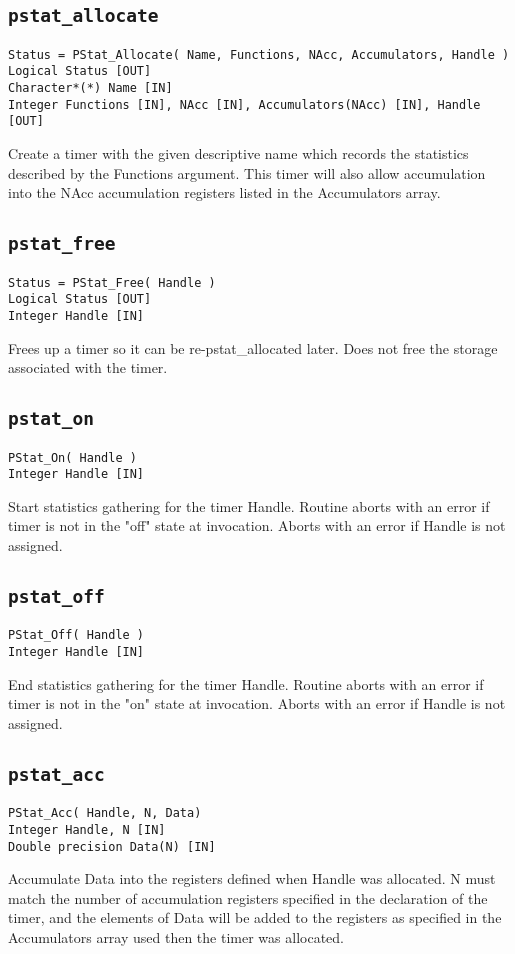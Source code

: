 \subsection{{\tt pstat\_allocate}}
\begin{verbatim}
Status = PStat_Allocate( Name, Functions, NAcc, Accumulators, Handle )
Logical Status [OUT]
Character*(*) Name [IN]
Integer Functions [IN], NAcc [IN], Accumulators(NAcc) [IN], Handle [OUT]
\end{verbatim}
Create a timer with the given descriptive name which records
the statistics described by the Functions argument. This timer
will also allow accumulation into the NAcc accumulation
registers listed in the Accumulators array.

\subsection{{\tt pstat\_free}}
\begin{verbatim}
Status = PStat_Free( Handle )
Logical Status [OUT]
Integer Handle [IN]
\end{verbatim}
Frees up a timer so it can be re-pstat\_allocated later.  Does
not free the storage associated with the timer.

\subsection{{\tt pstat\_on}}
\begin{verbatim}
PStat_On( Handle )
Integer Handle [IN]
\end{verbatim}
Start statistics gathering for the timer Handle.  Routine
aborts with an error if timer is not in the "off" state at
invocation.  Aborts with an error if Handle is not assigned.

\subsection{{\tt pstat\_off}}
\begin{verbatim}
PStat_Off( Handle )
Integer Handle [IN]
\end{verbatim}
End statistics gathering for the timer Handle.  Routine aborts
with an error if timer is not in the "on" state at invocation.
Aborts with an error if Handle is not assigned.

\subsection{{\tt pstat\_acc}}
\begin{verbatim}
PStat_Acc( Handle, N, Data)
Integer Handle, N [IN]
Double precision Data(N) [IN]
\end{verbatim}
Accumulate Data into the registers defined when Handle was
allocated. N must match the number of accumulation registers
specified in the declaration of the timer, and the elements of
Data will be added to the registers as specified in the
Accumulators array used then the timer was allocated.

